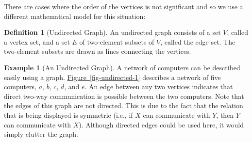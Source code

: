 \documentclass[10pt,]{book}
\theoremstyle{plain}
\theoremstyle{definition}
\newtheorem{definition}[theorem]{Definition}
\theoremstyle{definition}
\theoremstyle{definition}
\newtheorem{example}[theorem]{Example}
\theoremstyle{definition}
\theoremstyle{definition}
\numberwithin{equation}{section}
\newlength{\panelmax}
\begin{document}
\par
There are cases where the order of the vertices is not significant and so we use a different mathematical model for this situation:%
\begin{definition}[Undirected Graph]\label{def-undirected-graph}
\label{notation-1}
An undirected graph consists of a set \(V\), called a vertex set, and a set \(E\) of two-element subsets of \(V\), called the edge set. The two-element subsets are drawn as lines connecting the vertices.%
\end{definition}
\begin{example}[An Undirected Graph]\label{ex-undirected-1}
A network of computers can be described easily using a graph.  \hyperref[fig-undirected-1]{Figure~\ref{fig-undirected-1}} describes a network of five
computers, \(a\), \(b\), \(c\), \(d\), and \(e\). An edge between any two vertices indicates that direct two-way communication
is possible between the two computers. Note that the edges of this graph are not directed. This is due to the fact that the relation that is being
displayed is symmetric (i.e., if \(X\) can communicate with \(Y\), then \(Y\) can communicate with \(X\)). Although directed
edges could be used here, it would simply clutter the graph.%
{%
\setlength{\panelmax}{0pt}
\newsavebox{\panelboxCimage}
\newlength{\phCimage}\setlength{\phCimage}{\ht\panelboxCimage+\dp\panelboxCimage}
\settototalheight{\phCimage}{\usebox{\panelboxCimage}}
\setlength{\panelmax}{\maxof{\panelmax}{\phCimage}}
\newsavebox{\panelboxDimage}
\newlength{\phDimage}\setlength{\phDimage}{\ht\panelboxDimage+\dp\panelboxDimage}
}
\end{example}
\end{document}
